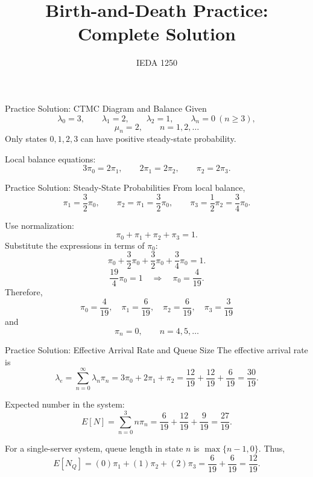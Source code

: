 \documentclass[10pt,aspectratio=169]{beamer}
\title{Birth-and-Death Practice: Complete Solution}
\author{IEDA 1250}
\date{}
\begin{document}
\begin{frame}{Practice Solution: CTMC Diagram and Balance}
Given
\[
\lambda_0=3,\qquad \lambda_1=2,\qquad \lambda_2=1,\qquad
\lambda_n=0\ (n\geq 3),
\]
\[
\mu_n=2,\qquad n=1,2,\ldots
\]
Only states \(0,1,2,3\) can have positive steady-state probability.

\vspace{0.25cm}
\begin{center}
\end{center}

\vspace{0.15cm}
Local balance equations:
\[
3\pi_0=2\pi_1,\qquad 2\pi_1=2\pi_2,\qquad \pi_2=2\pi_3.
\]
\end{frame}

\begin{frame}{Practice Solution: Steady-State Probabilities}
From local balance,
\[
\pi_1=\frac{3}{2}\pi_0,
\qquad
\pi_2=\pi_1=\frac{3}{2}\pi_0,
\qquad
\pi_3=\frac{1}{2}\pi_2=\frac{3}{4}\pi_0.
\]

Use normalization:
\[
\pi_0+\pi_1+\pi_2+\pi_3=1.
\]
Substitute the expressions in terms of \(\pi_0\):
\[
\pi_0+\frac{3}{2}\pi_0+\frac{3}{2}\pi_0+\frac{3}{4}\pi_0=1.
\]
\[
\frac{19}{4}\pi_0=1
\quad \Rightarrow \quad
\pi_0=\frac{4}{19}.
\]
Therefore,
\[
\boxed{
\pi_0=\frac{4}{19},\quad
\pi_1=\frac{6}{19},\quad
\pi_2=\frac{6}{19},\quad
\pi_3=\frac{3}{19}
}
\]
and
\[
\boxed{\pi_n=0,\qquad n=4,5,\ldots}
\]
\end{frame}

\begin{frame}{Practice Solution: Effective Arrival Rate and Queue Size}
The effective arrival rate is
\[
\lambda_e=\sum_{n=0}^{\infty}\lambda_n\pi_n
=3\pi_0+2\pi_1+\pi_2
=\frac{12}{19}+\frac{12}{19}+\frac{6}{19}
=\frac{30}{19}.
\]

Expected number in the system:
\[
E[N]=\sum_{n=0}^{3}n\pi_n
=\frac{6}{19}+\frac{12}{19}+\frac{9}{19}
=\frac{27}{19}.
\]

For a single-server system, queue length in state \(n\) is \(\max\{n-1,0\}\). Thus,
\[
E[N_Q]=(0)\pi_1+(1)\pi_2+(2)\pi_3
=\frac{6}{19}+\frac{6}{19}
=\frac{12}{19}.
\]
\end{frame}
\end{document}
